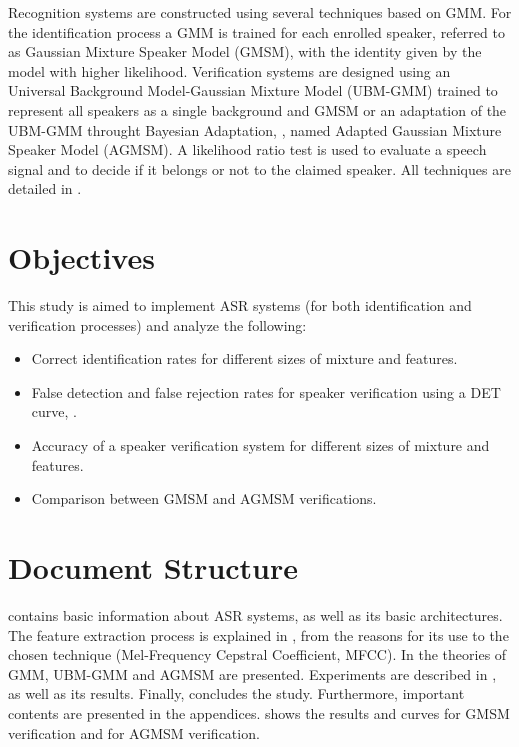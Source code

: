 Recognition systems are constructed using several techniques based on GMM. For the identification process a GMM is trained for each enrolled speaker, referred to as Gaussian Mixture Speaker Model (GMSM), with the identity given by the model with higher likelihood. Verification systems are designed using an Universal Background Model-Gaussian Mixture Model (UBM-GMM) trained to represent all speakers as a single background and GMSM or an adaptation of the UBM-GMM throught Bayesian Adaptation, , named Adapted Gaussian Mixture Speaker Model (AGMSM). A likelihood ratio test is used to evaluate a speech signal and to decide if it belongs or not to the claimed speaker. All techniques are detailed in .


\section{Objectives}

This study is aimed to implement ASR systems (for both identification and verification processes) and analyze the following:

\begin{itemize}\itemsep0pt
    \item Correct identification rates for different sizes of mixture and features.
    \item False detection and false rejection rates for speaker verification using a DET curve, .
    \item Accuracy of a speaker verification system for different sizes of mixture and features.
    \item Comparison between GMSM and AGMSM verifications.
\end{itemize}

\section{Document Structure}

 contains basic information about ASR systems, as well as its basic architectures. The feature extraction process is explained in , from the reasons for its use to the chosen technique (Mel-Frequency Cepstral Coefficient, MFCC). In  the theories of GMM, UBM-GMM and AGMSM are presented. Experiments are described in , as well as its results. Finally,  concludes the study. Furthermore, important contents are presented in the appendices.  shows the results and curves for GMSM verification and  for AGMSM verification.